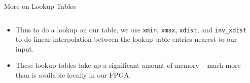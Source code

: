 \documentclass[aspectratio=169,xcolor=dvipsnames]{beamer}
\begin{document}
\begin{frame}{More on Lookup Tables}
\begin{columns}[t]
\begin{adjustbox}{width=\textwidth}

        \end{adjustbox}
    \end{columns}

    \begin{itemize}
        \item Thus to do a lookup on our table, we use \texttt{xmin}, \texttt{xmax}, \texttt{xdist}, and \texttt{inv\_xdist} to do linear interpolation between the lookup table entries nearest to our input.
        \item These lookup tables take up a significant amount of memory -- much more than is available locally in our FPGA.
    \end{itemize}


\end{frame}


\end{document}
